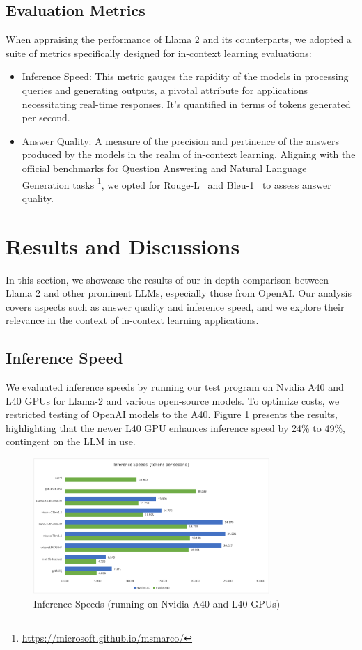 \documentclass[conference]{IEEEtran}
\begin{document}
\subsection{Evaluation Metrics}
When appraising the performance of Llama 2 and its counterparts, we adopted a suite of metrics specifically designed for in-context learning evaluations: 
\begin{itemize}
    \item Inference Speed: This metric gauges the rapidity of the models in processing queries and generating outputs, a pivotal attribute for applications necessitating real-time responses. It's quantified in terms of tokens generated per second.
    \item Answer Quality: A measure of the precision and pertinence of the answers produced by the models in the realm of in-context learning. Aligning with the official benchmarks for Question Answering and Natural Language Generation tasks \footnote{\url{https://microsoft.github.io/msmarco/}}, we opted for Rouge-L~\cite{lin2004rouge,joshi2023deepsumm} and Bleu-1~\cite{dey2022evaluating} to assess answer quality.
    
\end{itemize}

\section{Results and Discussions}
In this section, we showcase the results of our in-depth comparison between Llama 2 and other prominent LLMs, especially those from OpenAI. Our analysis covers aspects such as answer quality and inference speed, and we explore their relevance in the context of in-context learning applications.

\subsection{Inference Speed}
We evaluated inference speeds by running our test program on Nvidia A40 and L40 GPUs for Llama-2 and various open-source models. To optimize costs, we restricted testing of OpenAI models to the A40. Figure \ref{fig:5} presents the results, highlighting that the newer L40 GPU enhances inference speed by 24\% to 49\%, contingent on the LLM in use.

\begin{figure}
\centering
  \includegraphics[width=0.80\textwidth]{figures/speed.png}
\caption{Inference Speeds (running on Nvidia A40 and L40 GPUs)}
\label{fig:5}       %
\end{figure}
\end{document}
